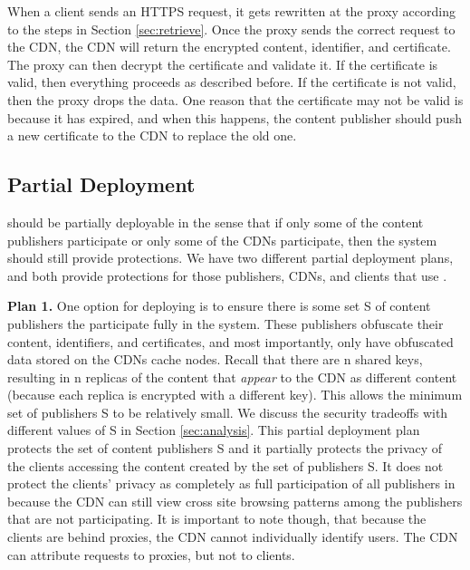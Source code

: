 When a client sends an HTTPS request, it gets rewritten at the proxy according to the steps in Section \ref{sec:retrieve}.  Once the proxy sends the 
correct request to the CDN, the CDN will return the encrypted content, identifier, and certificate.  The proxy can then decrypt 
the certificate and validate it.  If the certificate is valid, then everything proceeds as described before.  If the certificate is 
not valid, then the proxy drops the data.  One reason that the certificate may not be valid is because it has expired, and when 
this happens, the content publisher should push a new certificate to the CDN to replace the old one.

\subsection{Partial Deployment}
\label{sec:partial}
\system{} should be partially deployable in the sense that if only some of the content publishers participate or only some of the CDNs participate, then 
the system should still provide protections.  We have two different partial deployment plans, and both provide protections for those 
publishers, CDNs, and clients that use \system{}. 

{\bf Plan 1.}
One option for deploying \system{} is to ensure there is some set S of content publishers the participate fully in the 
system.  These publishers obfuscate their content, identifiers, and certificates, and most importantly, only have 
obfuscated data stored on the CDNs cache nodes.  Recall that there are n shared keys, resulting in n replicas of the 
content that {\it appear} to the CDN as different content (because each replica is encrypted with a different key).  This 
allows the minimum set of publishers S to be relatively small.  We discuss the security tradeoffs with different 
values of S in Section \ref{sec:analysis}.  This partial deployment plan protects the set of content publishers S and it 
partially protects the privacy of the clients accessing the content created by the set of publishers S.  It does not 
protect the clients' privacy as completely as full participation of all publishers in \system{} because the CDN can 
still view cross site browsing patterns among the publishers that are not participating. It is important to note though, that 
because the clients are behind proxies, the CDN cannot individually identify users.  The CDN can attribute requests to proxies, but 
not to clients.  

